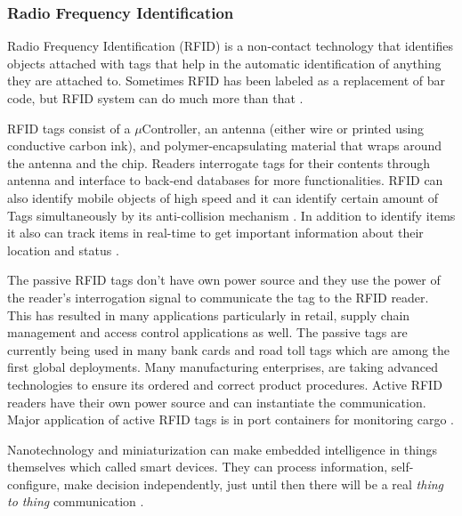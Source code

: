 \subsubsection{Radio Frequency Identification}
Radio Frequency Identification (\acs{RFID}) is a non-contact technology that identifies objects attached with tags that help in the automatic identification of anything they are attached to. Sometimes \acs{RFID} has been labeled as a replacement of bar code, but \acs{RFID} system can do much more than that \cite{RFIDMIS,IOTFUTURE}.

\acs{RFID} tags consist of a $\mu$Controller, an antenna (either wire or printed using conductive carbon ink), and polymer-encapsulating material that wraps around the antenna and the chip. Readers interrogate tags for their contents through antenna and interface to back-end databases for more functionalities. \acs{RFID} can also identify mobile objects of high speed and it can identify certain amount of Tags simultaneously by its anti-collision mechanism \cite{RFIDMIS}. In addition to identify items it also can track items in real-time to get important information about their location and status \cite{IOTFUTURE}. 

The passive \acs{RFID} tags don't have  own power source and they use the power of the reader’s interrogation signal to communicate the tag to the \acs{RFID} reader. This has resulted in many applications particularly in retail, supply chain management and access control applications as well. The passive tags are currently being used in many bank cards and road toll tags which are among the first global deployments. Many
manufacturing enterprises, are taking advanced technologies to ensure its ordered and correct product procedures. Active \acs{RFID} readers have their own power source and can instantiate the communication. Major application of active \acs{RFID} tags is in port containers for monitoring cargo \cite{IOTGUBBI,RFIDMIS}.

Nanotechnology and miniaturization can make embedded intelligence in things themselves which called smart devices. They can process information, self-configure, make decision independently, just until then there will be a real \textit{thing to thing}  communication \cite{IOTFUTURE}.
